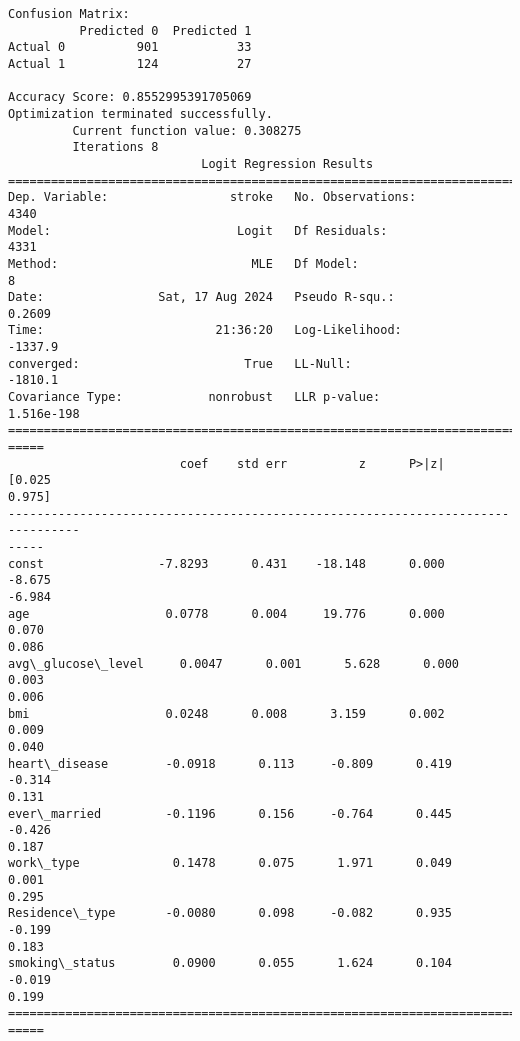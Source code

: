\documentclass[11pt]{article}
\begin{document}
    \begin{Verbatim}[commandchars=\\\{\}]
Confusion Matrix:
          Predicted 0  Predicted 1
Actual 0          901           33
Actual 1          124           27

Accuracy Score: 0.8552995391705069
Optimization terminated successfully.
         Current function value: 0.308275
         Iterations 8
                           Logit Regression Results
==============================================================================
Dep. Variable:                 stroke   No. Observations:                 4340
Model:                          Logit   Df Residuals:                     4331
Method:                           MLE   Df Model:                            8
Date:                Sat, 17 Aug 2024   Pseudo R-squ.:                  0.2609
Time:                        21:36:20   Log-Likelihood:                -1337.9
converged:                       True   LL-Null:                       -1810.1
Covariance Type:            nonrobust   LLR p-value:                1.516e-198
================================================================================
=====
                        coef    std err          z      P>|z|      [0.025
0.975]
--------------------------------------------------------------------------------
-----
const                -7.8293      0.431    -18.148      0.000      -8.675
-6.984
age                   0.0778      0.004     19.776      0.000       0.070
0.086
avg\_glucose\_level     0.0047      0.001      5.628      0.000       0.003
0.006
bmi                   0.0248      0.008      3.159      0.002       0.009
0.040
heart\_disease        -0.0918      0.113     -0.809      0.419      -0.314
0.131
ever\_married         -0.1196      0.156     -0.764      0.445      -0.426
0.187
work\_type             0.1478      0.075      1.971      0.049       0.001
0.295
Residence\_type       -0.0080      0.098     -0.082      0.935      -0.199
0.183
smoking\_status        0.0900      0.055      1.624      0.104      -0.019
0.199
================================================================================
=====
    \end{Verbatim}

    \begin{center}
    \end{center}
    { \hspace*{\fill} \\}
    
\end{document}
